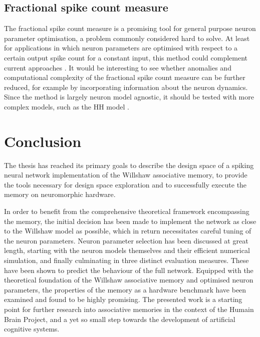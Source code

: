 \subsection{Fractional spike count measure}
The fractional spike count measure is a promising tool for general purpose neuron parameter optimisation, a problem commonly considered hard to solve. At least for applications in which neuron parameters are optimised with respect to a certain output spike count for a constant input, this method could complement current approaches \cite{prinz2007neuronal}. It would be interesting to see whether anomalies and computational complexity of the fractional spike count measure can be further reduced, for example by incorporating information about the neuron dynamics. Since the method is largely neuron model agnostic, it should be tested with more complex models, such as the \acrfull{HH} model \cite{hodgkin1952quantitative}.


\section{Conclusion}

The thesis has reached its primary goals to describe the design space of a spiking neural network implementation of the Willshaw associative memory, to provide the tools necessary for design space exploration and to successfully execute the memory on neuromorphic hardware.

In order to benefit from the comprehensive theoretical framework encompassing the memory, the initial decision has been made to implement the network as close to the Willshaw model as possible, which in return necessitates careful tuning of the neuron parameters. Neuron parameter selection has been discussed at great length, starting with the neuron models themselves and their efficient numerical simulation, and finally culminating in three distinct evaluation measures. These have been shown to predict the behaviour of the full network. Equipped with the theoretical foundation of the Willshaw associative memory and optimised neuron parameters, the properties of the memory as a hardware benchmark have been examined and found to be highly promising. The presented work is a starting point for further research into associative memories in the context of the Humain Brain Project, and a yet so small step towards the development of artificial cognitive systems.
